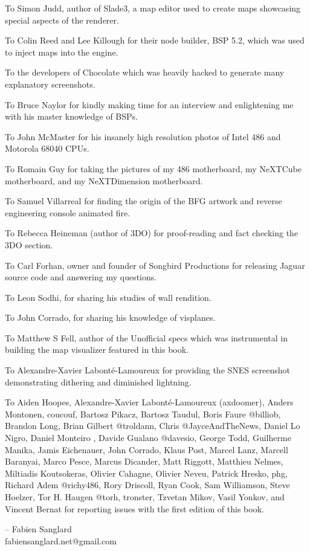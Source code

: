 \par
To Simon Judd, author of Slade3, a map editor used to create maps showcasing special aspects of the renderer.\\
\par
To Colin Reed and Lee Killough for their node builder, BSP 5.2, which was used to inject maps into the \doom{} engine.\\
\par
To the developers of Chocolate \doom{} which was heavily hacked to generate many explanatory screenshots.\\
\par
To Bruce Naylor for kindly making time for an interview and enlightening me with his master knowledge of BSPs.\\
\par
To John McMaster for his insanely high resolution photos of Intel 486 and Motorola 68040 CPUs.\\
\par
To Romain Guy for taking the pictures of my 486 motherboard, my NeXTCube motherboard, and my NeXTDimension motherboard.\\
\par
To Samuel Villarreal for finding the origin of the BFG artwork and reverse engineering \doom{} console animated fire.\\
\par
To Rebecca Heineman (author of \doom{} 3DO) for proof-reading and fact checking the 3DO section.\\
\par
To Carl Forhan, owner and founder of Songbird Productions for releasing \doom{} Jaguar source code and answering my questions.\\
\par
To Leon Sodhi, for sharing his studies of \doom{} wall rendition.\\
\par
To John Corrado, for sharing his knowledge of visplanes.\\
\par
To Matthew S Fell, author of the Unofficial \doom{} specs which was instrumental in building the map visualizer featured in this book.\\
\par
To Alexandre-Xavier Labont\'{e}-Lamoureux for providing the SNES screenshot demonstrating dithering and diminished lightning.\\
\par
To Aiden Hoopes, Alexandre-Xavier Labont\'{e}-Lamoureux (axdoomer), Anders Montonen, coucouf, Bartosz Pikacz, Bartosz Taudul, Boris Faure @billiob, Brandon Long, Brian Gilbert @troldann, Chris @JayceAndTheNews, Daniel Lo Nigro, Daniel Monteiro , Davide Gualano @davesio, George Todd, Guilherme Manika, Jamis Eichenauer, John Corrado, Klaus Post, Marcel Lanz, Marcell Baranyai, Marco Pesce, Marcus Dicander, Matt Riggott, Matthieu Nelmes, Miltiadis Koutsokeras, Olivier Cahagne, Olivier Neveu, Patrick Hresko, phg, Richard Adem @richy486, Rory Driscoll, Ryan Cook, Sam Williamson, Steve Hoelzer, Tor H. Haugen @torh, tronster, Tzvetan Mikov, Vasil Yonkov, and Vincent Bernat for reporting issues with the first edition of this book.\\
\par
-- Fabien Sanglard\\
fabiensanglard.net@gmail.com

